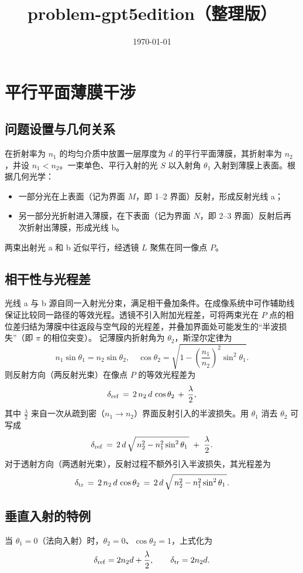 \documentclass{ctexart}
\title{problem-gpt5edition（整理版）}
\author{ }
\date{\today}
\begin{document}
\maketitle

\section{平行平面薄膜干涉}
\subsection{问题设置与几何关系}
在折射率为 \(n_1\) 的均匀介质中放置一层厚度为 \(d\) 的平行平面薄膜，其折射率为 \(n_2\)，并设 \(n_1<n_2\)。一束单色、平行入射的光 \(S\) 以入射角 \(\theta_1\) 入射到薄膜上表面。根据几何光学：
\begin{itemize}
    \item 一部分光在上表面（记为界面 \(M\)，即 1--2 界面）反射，形成反射光线 a；
    \item 另一部分光折射进入薄膜，在下表面（记为界面 \(N\)，即 2--3 界面）反射后再次折射出薄膜，形成光线 b。
\end{itemize}
两束出射光 a 和 b 近似平行，经透镜 \(L\) 聚焦在同一像点 \(P\)。

\subsection{相干性与光程差}
光线 a 与 b 源自同一入射光分束，满足相干叠加条件。在成像系统中可作辅助线保证比较同一路径的等效光程。透镜不引入附加光程差，可将两束光在 \(P\) 点的相位差归结为薄膜中往返段与空气段的光程差，并叠加界面处可能发生的“半波损失”（即 \(\pi\) 的相位突变）。
记薄膜内折射角为 \(\theta_2\)，斯涅尔定律为
\[
    n_1\sin\theta_1=n_2\sin\theta_2,\quad \cos\theta_2=\sqrt{1-\left(\frac{n_1}{n_2}\right)^2\sin^2\theta_1}.
\]
则反射方向（两反射光束）在像点 \(P\) 的等效光程差为
\[
    \delta_{\rm ref} \,=\, 2\,n_2\,d\,\cos\theta_2 \, + \, \frac{\lambda}{2},
\]
其中 \(\tfrac{\lambda}{2}\) 来自一次从疏到密（\(n_1\to n_2\)）界面反射引入的半波损失。用 \(\theta_1\) 消去 \(\theta_2\) 可写成
\[
    \delta_{\rm ref} \,=\, 2\,d\,\sqrt{\,n_2^2 - n_1^2\sin^2\theta_1\,}\; +\; \frac{\lambda}{2}.
\]
对于透射方向（两透射光束），反射过程不额外引入半波损失，其光程差为
\[
    \delta_{\rm tr} \,=\, 2\,n_2\,d\,\cos\theta_2 \,=\, 2\,d\,\sqrt{\,n_2^2 - n_1^2\sin^2\theta_1\,}.
\]

\subsection{垂直入射的特例}
当 \(\theta_1=0\)（法向入射）时，\(\theta_2=0\)、\(\cos\theta_2=1\)，上式化为
\[
    \delta_{\rm ref}=2n_2d+\frac{\lambda}{2},\qquad \delta_{\rm tr}=2n_2d.
\]
\end{document}
